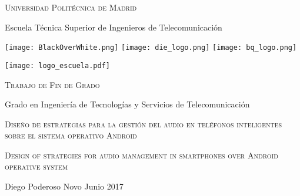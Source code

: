 \begin{titlepage}
	\begin{center}
	
		\large {\textsc{\textsf{Universidad Politécnica de Madrid}}}
		
		\bigskip
		\bigskip
		
		\large {\textsf{Escuela Técnica Superior de Ingenieros de Telecomunicación}}
	
		\bigskip
		\texttt{[image: BlackOverWhite.png]}
		\texttt{[image: die\_logo.png]}
		\texttt{[image: bq\_logo.png]}
		\bigskip

		\texttt{[image: logo\_escuela.pdf]}
		
		\bigskip
		\bigskip
		\bigskip
		
		\large {\textsc{\textsf{Trabajo de Fin de Grado}}}
		
		\bigskip
		\bigskip
		\bigskip
		
		\large {\textsf{Grado en Ingeniería de Tecnologías y Servicios de Telecomunicación}}
		
		\bigskip
		\bigskip
		\bigskip
		
		\large {\textsc{\textsf{Diseño de estrategias para la gestión del audio en teléfonos inteligentes sobre el sistema operativo Android}}}
		
		\bigskip
		
		\large {\textsc{\textsf{Design of strategies for audio management in smartphones over Android operative system}}}
		
		\bigskip
		\bigskip
		\bigskip
		\bigskip
		
		\large {Diego Poderoso Novo}
		\linebreak
		\large {Junio 2017}
				
	\end{center}
\end{titlepage}